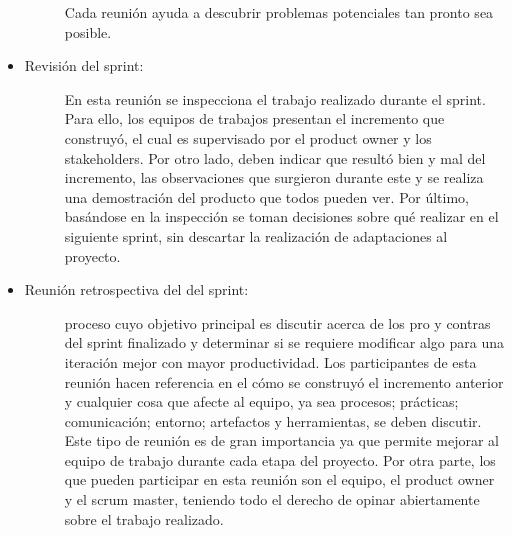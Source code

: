 \begin{itemize}
\begin{description}
                Cada reunión ayuda a descubrir problemas potenciales tan pronto sea posible.
            \end{description}
    
    \item   \begin{description}
                \item[Revisión del sprint: ] En esta reunión se inspecciona el trabajo realizado durante el sprint. Para ello, los equipos de trabajos presentan el incremento que construyó, el cual es supervisado por el product owner y los stakeholders. Por otro lado, deben indicar que resultó bien y mal del incremento, las observaciones que surgieron durante este y se realiza una demostración del producto que todos pueden ver. Por último, basándose en la inspección se toman decisiones sobre qué realizar en el siguiente sprint, sin descartar la realización de adaptaciones al proyecto. 
        
            \end{description}

    \item   \begin{description}
                \item[Reunión retrospectiva del del sprint: ] proceso cuyo objetivo principal es discutir acerca de los pro y contras del sprint finalizado y determinar si se requiere modificar algo para una iteración mejor con mayor productividad. Los participantes de esta reunión hacen referencia en el cómo se construyó el incremento anterior y cualquier cosa que afecte al equipo, ya sea procesos; prácticas; comunicación; entorno; artefactos y herramientas, se deben discutir. Este tipo de reunión es de gran importancia ya que permite mejorar al equipo de trabajo durante cada etapa del proyecto. Por otra parte, los que pueden participar en esta reunión son el equipo, el product owner y el scrum master, teniendo todo el derecho de opinar abiertamente sobre el trabajo realizado.

            \end{description}
\end{itemize}
